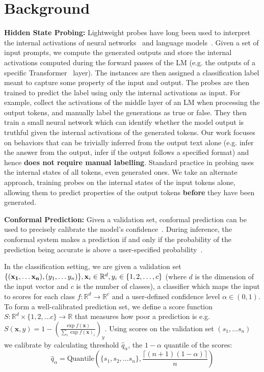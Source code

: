\section{Background}
\label{sec:background}
\textbf{Hidden State Probing:} Lightweight probes have long been used to interpret the internal activations of neural networks~\citep{alain2017understanding} and language models~\citep{petroni2019language, azaria-mitchell-2023-internal}. Given a set of input prompts, we compute the generated outputs and store the internal activations computed during the forward passes of the LM (e.g. the outputs of a specific Transformer~\citep{vaswani2017attention} layer). The instances are then assigned a classification label meant to capture some property of the input and output. The probes are then trained to predict the label using only the internal activations as input. For example, \citet{azaria-mitchell-2023-internal} collect the activations of the middle layer of an LM when processing the output tokens, and manually label the generations as true or false. They then train a small neural network which can identify whether the model output is truthful given the internal activations of the generated tokens. Our work focuses on behaviors that can be trivially inferred from the output text alone (e.g. infer the answer from the output, infer if the output follows a specified format) and hence \textbf{does not require manual labelling}. Standard practice in probing uses the internal states of all tokens, even generated ones. We take an alternate approach, training probes on the internal states of the input tokens alone, allowing them to predict properties of the output tokens \textbf{before} they have been generated.


\textbf{Conformal Prediction:} Given a validation set, conformal prediction can be used to precisely calibrate the model's confidence~\citep{gammerman2013learning, kumar2023conformal}. During inference, the conformal system makes a prediction if and only if the probability of the prediction being accurate is above a user-specified probability~\citep{shafer2008tutorial}. 

In the classification setting, we are given a validation set $\{({\bf x_1}, \ldots  {\bf x_n}), (y_1, \ldots y_n)\}, \mathbf{x}_i\in\mathbb{R}^d, y_i\in\{1, 2, \ldots, c\}$ (where $d$ is the dimension of the input vector and $c$ is the number of classes), a classifier which maps the input to scores for each class $f:\mathbb{R}^d\to\mathbb{R}^{c}$ and a user-defined confidence level $\alpha\in(0, 1)$. To form a well-calibrated prediction set, we define a score function $S: \mathbb{R}^d\times \{1, 2, \ldots c\}\to\mathbb{R}$ that measures how poor a prediction is e.g. $S(\mathbf{x}, y) = 1-(\frac{\exp{f(\mathbf{x})}}{\sum_i{\exp{f(\mathbf{x})}_i}})_y$. Using scores on the validation set $(s_1, \ldots s_n)$ we calibrate by calculating threshold $\hat{q}_\alpha$, the $1-\alpha$ quantile of the scores:
\begin{equation}
    \hat{q}_\alpha = \text{Quantile}(\{s_1, s_2, \ldots s_n\}, \frac{\lceil(n+1)(1-\alpha)\rceil}{n})
\end{equation}

